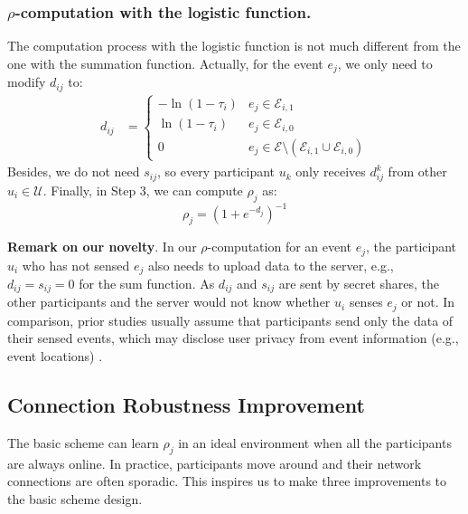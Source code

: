 \subsubsection{$\rho$-computation with the logistic function.} The computation process with the logistic function is not much different from the one with the summation function. Actually, for the event $e_j$, we only need to modify $d_{ij}$ to:
 \begin{align}
 	d_{ij} & = 
 	\begin{cases}
 		-\ln(1-\tau_i) & e_j \in \mathcal E_{i,1} \\
 	    \ln (1-\tau_i) & e_j \in \mathcal E_{i,0}\\
 		0 & e_j \in \mathcal E\setminus(\mathcal E_{i,1}\cup \mathcal E_{i,0})
 	\end{cases}
 \end{align}
Besides, we do not need $s_{ij}$, so every participant $u_k$ only receives $d_{ij}^k$ from other $u_i \in \mathcal U$. Finally, in Step 3, we can compute $\rho_j$ as:
\begin{equation}
	\rho_j = (1+e^{-d_j})^{-1}
\end{equation}

\textbf{Remark on our novelty}. In our $\rho$-computation for an event $e_j$, the participant $u_i$ who has not sensed $e_j$ also needs to upload data to the server, e.g., $d_{ij}=s_{ij}=0$ for the sum function. As $d_{ij}$ and $s_{ij}$ are sent by secret shares, the other participants and the server would not know whether $u_i$ senses $e_j$ or not. In comparison, prior studies usually assume that participants send only the data of their sensed events, which may disclose user privacy from event information (e.g., event locations) \citep{Miao2015CloudEnabledPT,Miao2017ALP,Miao2019PrivacyPreservingTD,Zheng2018LearningTT,Zheng2020PrivacyAwareAE,Zhang2021ReliableAP}. 

\subsection{Connection Robustness Improvement}

The basic scheme can learn $\rho_j$ in an ideal environment when all the participants are always online. In practice, participants move around and their network connections are often sporadic. This inspires us to make three improvements to the basic scheme design.

